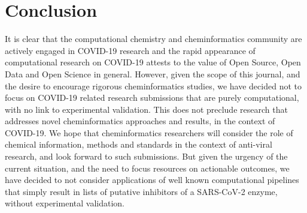 \documentclass{bmcart}
\begin{document}
\section*{Conclusion}

It is clear that the computational chemistry and cheminformatics
community are actively engaged in COVID-19 research and the rapid
appearance of computational research \cite{jcim_covid_editorial} on
COVID-19 attests to the value of Open Source, Open Data and Open
Science in general. However, given the scope of this journal, and the
desire to encourage rigorous cheminformatics studies, we have decided
not to focus on COVID-19 related research submissions that are purely
computational, with no link to experimental validation. This does not
preclude research that addresses novel cheminformatics approaches and
results, in the context of COVID-19. We hope that cheminformatics
researchers will consider the role of chemical information, methods
and standards in the context of anti-viral research, and look forward
to such submissions. But given the urgency of the current situation,
and the need to focus resources on actionable outcomes, we have
decided to not consider applications of well known computational
pipelines that simply result in lists of putative inhibitors of a
SARS-CoV-2 enzyme, without experimental validation.
\end{document}
